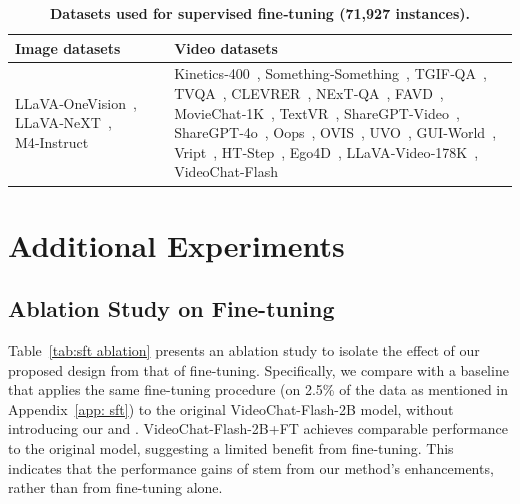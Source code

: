 \begin{table}[t!]
\renewcommand{\thetable}{C}
\centering
\caption{\textbf{Datasets used for supervised fine‑tuning (71,927 instances).}}
\vspace{3pt}
\label{tab: A dataset}
\begin{tabular}{p{} p{}}
\toprule
\textbf{Image datasets} &
\textbf{Video datasets} \\
\midrule
LLaVA‑OneVision~\cite{li2024llava}, LLaVA‑NeXT~\cite{liu2024llavanext}, M4‑Instruct~\cite{li2024llavainterleave} &
Kinetics‑400~\cite{kay2017kinetics}, Something‑Something~\cite{goyal2017something}, TGIF‑QA~\cite{jang2017tgif}, TVQA~\cite{lei2018tvqa}, CLEVRER~\cite{yi2019clevrer}, NExT‑QA~\cite{xiao2021next}, FAVD~\cite{shen2023fine}, MovieChat‑1K~\cite{song2024moviechat}, TextVR~\cite{wu2025large}, ShareGPT‑Video~\cite{chen2024sharegpt4video}, ShareGPT‑4o~\cite{cui2024sharegpt}, Oops~\cite{epstein2019oops}, OVIS~\cite{qi2022occluded}, UVO~\cite{wang2021unidentified}, GUI‑World~\cite{chen2024gui}, Vript~\cite{yang2024vript}, HT‑Step~\cite{afouras2023ht}, Ego4D~\cite{grauman2022ego4d}, LLaVA‑Video‑178K~\cite{zhang2024videoinstructiontuningsynthetic}, VideoChat-Flash~\cite{li2024videochat} \\
\bottomrule
\end{tabular}
\end{table}

\section{Additional Experiments}

\subsection{Ablation Study on Fine-tuning}

Table~\ref{tab:sft ablation} presents an ablation study to isolate the effect of our proposed design from that of fine-tuning. Specifically, we compare \name with a baseline that applies the same fine-tuning procedure (on 2.5\% of the data as mentioned in Appendix~\ref{app: sft}) to the original VideoChat-Flash-2B model, without introducing our \drop and \segment. VideoChat-Flash-2B+FT achieves comparable performance to the original model, suggesting a limited benefit from fine-tuning. This indicates that the performance gains of \name stem from our method's enhancements, rather than from fine-tuning alone.

